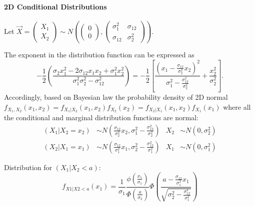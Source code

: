 \documentclass[a4paper]{article}
\numberwithin{equation}{subsection}
\begin{document}
\paragraph{2D Conditional Distributions}
Let
\begin{math}
  \vec{X}=
  \begin{pmatrix}
    X_1\\
    X_2
  \end{pmatrix}
  \sim
  N \left( 
    \begin{pmatrix}
      0\\0
    \end{pmatrix},
    \begin{pmatrix}
      \sigma_1^2 & \sigma_{12} \\ 
      \sigma_{12} & \sigma_2^2
    \end{pmatrix}
\right)
\end{math}.

The exponent in the distribution function can be expressed as
\begin{equation}
  -\frac{1}{2} \left(
    \frac{
      \sigma_{2}x_{1}^{2} - 2 \sigma_{12} x_{1} x_{2} +
      \sigma_{1}^{2} x_{2}^{2}}
    {\sigma_{1}^{2} \sigma_{2}^{2} - \sigma_{12}^{2}}
  \right)
  =
  -\frac{1}{2} \left[
    \frac{\left(
        x_{1} - 
        \displaystyle\frac{\sigma_{12}}{\sigma_{2}^{2}}x_{2}
      \right)^{2}}
    {\sigma_{1}^{2} - \displaystyle\frac{\sigma_{12}^{2}}{\sigma_{2}^{2}}}
    +
    \frac{x_{2}^{2}}{\sigma_{2}^{2}}
  \right].
  \label{eq:normal2D_exponent}
\end{equation}
Accordingly, based on Bayesian law the probability density of 2D normal
\begin{math}
f_{X_{1},X_{2}}(x_{1},x_{2}) = 
f_{X_{1}|X_{2}}(x_{1},x_{2}) f_{X_{2}}(x_{2}) =
f_{X_{2}|X_{1}}(x_{1},x_{2}) f_{X_{1}}(x_{1})
\end{math}
where all the conditional and marginal distribution functions are
normal:
\begin{align}
  (X_{1}|X_{2} = x_{2}) 
  &\sim
  N \left(
    \frac{\sigma_{12}}{\sigma_{2}^{2}} x_{2},
    \sigma_{1}^{2} - \frac{\sigma_{12}^{2}}{\sigma_{2}^{2}}
  \right)
  &
  X_{2} &\sim N(0, \sigma_{2}^{2})
  \\
  (X_{2}|X_{1} = x_{1}) 
  &\sim
  N \left(
    \frac{\sigma_{12}}{\sigma_{1}^{2}} x_{1},
    \sigma_{2}^{2} - \frac{\sigma_{12}^{2}}{\sigma_{1}^{2}}
  \right)
  &
  X_{1} &\sim N(0, \sigma_{1}^{2})
\end{align}

Distribution for $(X_{1}|X_{2} < a)$:
\begin{equation}
  f_{X1|X2 < a}(x_{1}) = 
  \frac{1}{\sigma_{1}}
  \frac{\phi \left( \frac{x_{1}}{\sigma_{1}} \right)}
  {\Phi \left( \frac{a}{\sigma_{2}} \right)}
  \Phi \left(
    \frac{a - \frac{\sigma_{12}}{\sigma_{1}^{2}} x_{1}}
    {\sqrt{\sigma_{2}^{2} - \frac{\sigma_{12}^{2}}{\sigma_{1}^{2}}}}
  \right)
\end{equation}
\end{document}
